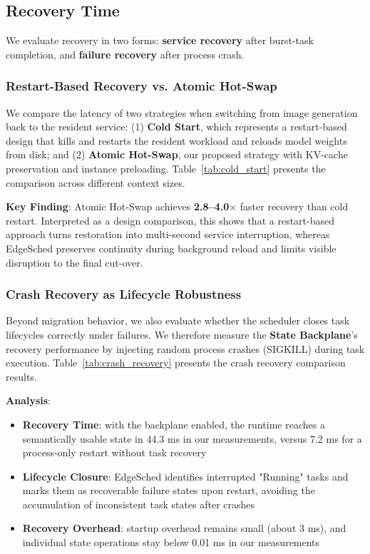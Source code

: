 \FloatBarrier

\subsection{Recovery Time}

We evaluate recovery in two forms: \textbf{service recovery} after burst-task completion, and \textbf{failure recovery} after process crash.

\subsubsection{Restart-Based Recovery vs. Atomic Hot-Swap}

We compare the latency of two strategies when switching from image generation back to the resident service: (1) \textbf{Cold Start}, which represents a restart-based design that kills and restarts the resident workload and reloads model weights from disk; and (2) \textbf{Atomic Hot-Swap}, our proposed strategy with KV-cache preservation and instance preloading. Table~\ref{tab:cold_start} presents the comparison across different context sizes.



\textbf{Key Finding}: Atomic Hot-Swap achieves \textbf{2.8--4.0$\times$} faster recovery than cold restart. Interpreted as a design comparison, this shows that a restart-based approach turns restoration into multi-second service interruption, whereas EdgeSched preserves continuity during background reload and limits visible disruption to the final cut-over.

\subsubsection{Crash Recovery as Lifecycle Robustness}

Beyond migration behavior, we also evaluate whether the scheduler closes task lifecycles correctly under failures. We therefore measure the \textbf{State Backplane}'s recovery performance by injecting random process crashes (SIGKILL) during task execution. Table~\ref{tab:crash_recovery} presents the crash recovery comparison results.



\textbf{Analysis}:
\begin{itemize}
\item \textbf{Recovery Time}: with the backplane enabled, the runtime reaches a semantically usable state in 44.3 ms in our measurements, versus 7.2 ms for a process-only restart without task recovery
\item \textbf{Lifecycle Closure}: EdgeSched identifies interrupted "Running" tasks and marks them as recoverable failure states upon restart, avoiding the accumulation of inconsistent task states after crashes
\item \textbf{Recovery Overhead}: startup overhead remains small (about 3 ms), and individual state operations stay below 0.01 ms in our measurements
\end{itemize}

